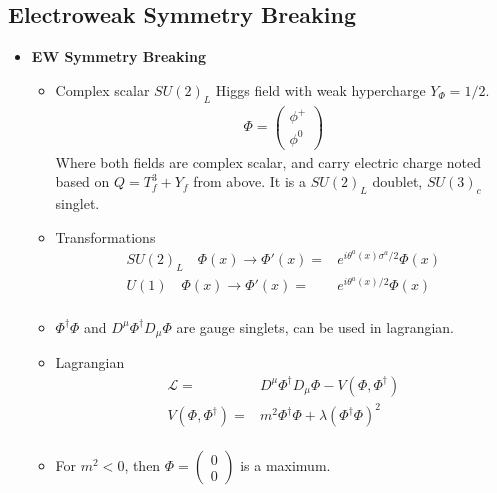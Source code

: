 \subsection{Electroweak Symmetry Breaking}
\begin{itemize}
    \item \textbf{EW Symmetry Breaking} \cite{wells}
    \begin{itemize}
        \item Complex scalar $SU(2)_L$ Higgs field with weak hypercharge $Y_\Phi=1/2$. \cite{wells}
        \begin{equation}\begin{split}
        \Phi=\begin{pmatrix}\phi^+\\\phi^0\end{pmatrix}
        \end{split}\end{equation}
        Where both fields are complex scalar, and carry electric charge noted based on $Q=T_f^3+Y_f$ from above. It is a $SU(2)_L$ doublet, $SU(3)_c$ singlet.
        \item Transformations \cite{wells}
        \begin{equation}\begin{split}
        SU(2)_L\quad\Phi(x)\to\Phi'(x)=&e^{i\theta^a(x)\sigma^a/2}\Phi(x) \\
        U(1)\quad\Phi(x)\to\Phi'(x)=&e^{i\theta^a(x)/2}\Phi(x) \\
        \end{split}\end{equation}
        \item $\Phi^\dagger\Phi$ and $D^\mu\Phi^\dagger D_\mu\Phi$ are gauge singlets, can be used in lagrangian. \cite{wells}
        \item Lagrangian \cite{wells}
        \begin{equation}\begin{split}
        \mathcal{L}=&D^\mu\Phi^\dagger D_\mu\Phi-V(\Phi,\Phi^\dagger) \\
        V(\Phi,\Phi^\dagger)=&m^2\Phi^\dagger\Phi+\lambda(\Phi^\dagger\Phi)^2 \\
        \end{split}\end{equation}
        \item For $m^2<0$, then $\Phi=\begin{pmatrix}0\\0\end{pmatrix}$ is a maximum. \cite{wells}

\end{itemize}
\end{itemize}

